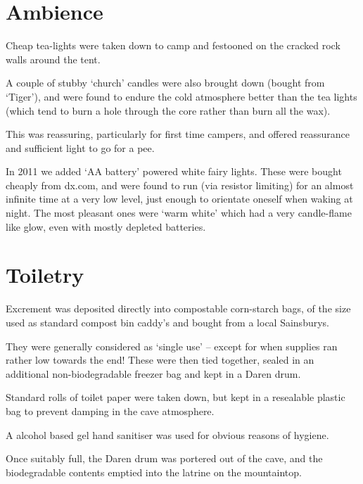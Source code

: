 \section{Ambience}

Cheap tea-lights were taken down to camp and festooned on the cracked rock walls around the tent.

A couple of stubby `church' candles were also brought down (bought from `Tiger'), and were found to endure the cold atmosphere better than the tea lights (which tend to burn a hole through the core rather than burn all the wax).

This was reassuring, particularly for first time campers, and offered reassurance and sufficient light to go for a pee.

In 2011 we added `AA battery' powered white fairy lights. These were bought cheaply from dx.com, and were found to run (via resistor limiting) for an almost infinite time at a very low level, just enough to orientate oneself when waking at night. The most pleasant ones were `warm white' which had a very candle-flame like glow, even with mostly depleted batteries.

\section{Toiletry}

Excrement was deposited directly into compostable corn-starch bags, of the size used as standard compost bin caddy's and bought from a local Sainsburys.

They were generally considered as `single use' -- except for when supplies ran rather low towards the end! These were then tied together, sealed in an additional non-biodegradable freezer bag and kept in a Daren drum.

Standard rolls of toilet paper were taken down, but kept in a resealable plastic bag to prevent damping in the cave atmosphere.

A alcohol based gel hand sanitiser was used for obvious reasons of hygiene.

Once suitably full, the Daren drum was portered out of the cave, and the biodegradable contents emptied into the latrine on the mountaintop.

